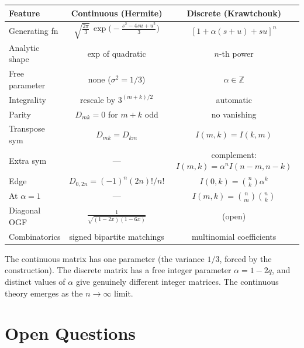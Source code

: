 \documentclass[11pt,a4paper]{article}
\theoremstyle{plain}
\theoremstyle{definition}
\begin{document}
\begin{tcolorbox}[breakable, colback=yellow!10, colframe=yellow!10,
  boxrule=0pt, sharp corners]
\begin{center}
\renewcommand{\arraystretch}{1.5}
\begin{tabular}{lcc}
  \toprule
  Feature & Continuous (Hermite) & Discrete (Krawtchouk) \\
  \midrule
  Generating fn &
    $\sqrt{\tfrac{2\pi}{3}}\,\exp\!\bigl(-\frac{s^2-4su+u^2}{3}\bigr)$
    & $[1 + \alpha(s{+}u) + su]^n$ \\[4pt]
  Analytic shape & exp of quadratic & $n$-th power \\
  Free parameter & none ($\sigma^2 = 1/3$) & $\alpha \in \mathbb{Z}$ \\
  Integrality & rescale by $3^{(m+k)/2}$ & automatic \\
  Parity & $D_{mk}=0$ for $m{+}k$ odd & no vanishing \\
  Transpose sym & $D_{mk} = D_{km}$ & $I(m,k) = I(k,m)$ \\
  Extra sym & --- & complement: $I(m,k) = \alpha^n I(n{-}m,n{-}k)$ \\
  Edge & $D_{0,2n} = (-1)^n(2n)!/n!$ & $I(0,k) = \binom{n}{k}\alpha^k$ \\
  At $\alpha=1$ & --- & $I(m,k) = \binom{n}{m}\binom{n}{k}$ \\
  Diagonal OGF &
    $\frac{1}{\sqrt{(1-2x)(1-6x)}}$ &
    (open) \\
  Combinatorics &
    signed bipartite matchings &
    multinomial coefficients \\
  \bottomrule
\end{tabular}
\end{center}

\medskip
The continuous matrix has one parameter (the variance $1/3$, forced
by the construction). The discrete matrix has a free integer
parameter $\alpha = 1 - 2q$, and distinct values of $\alpha$ give
genuinely different integer matrices. The continuous theory emerges
as the $n \to \infty$ limit.
\end{tcolorbox}

\section{Open Questions}
\end{document}
